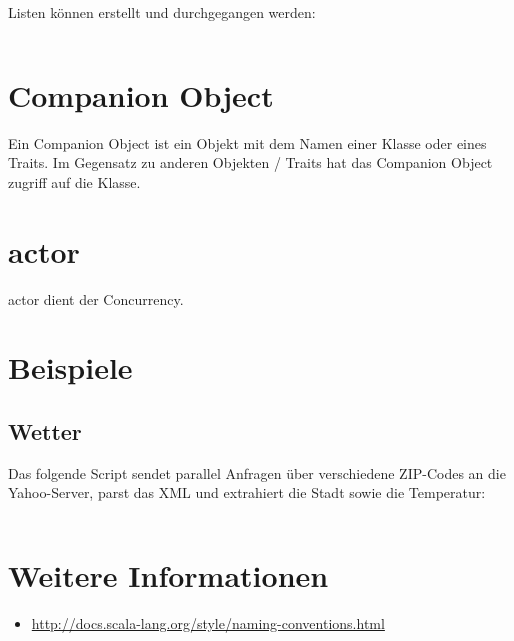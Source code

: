 Listen können erstellt und durchgegangen werden:

\inputminted[numbersep=5pt, tabsize=4]{scala}{scripts/scala/extended-for.scala}

\section{Companion Object}
Ein Companion Object ist ein Objekt mit dem Namen einer Klasse oder eines Traits.
Im Gegensatz zu anderen Objekten / Traits hat das Companion Object zugriff auf
die Klasse.

\section{actor}
actor dient der Concurrency.

\section{Beispiele}
\subsection{Wetter}
Das folgende Script sendet parallel Anfragen über verschiedene ZIP-Codes an
die Yahoo-Server, parst das XML und extrahiert die Stadt sowie die Temperatur:

\inputminted[linenos, numbersep=5pt, tabsize=4, frame=lines, label=weather.scala]{scala}{scripts/scala/weather.scala}

\section{Weitere Informationen}
\begin{itemize}
    \item \url{http://docs.scala-lang.org/style/naming-conventions.html}
\end{itemize}

